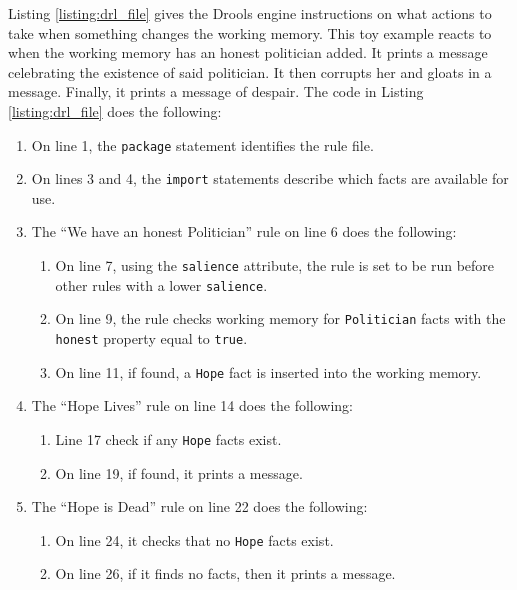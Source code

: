 Listing \ref{listing:drl_file} gives the Drools engine instructions on what actions to take when something changes the working memory.
This toy example reacts to when the working memory has an honest politician added. 
It prints a message celebrating the existence of said politician.
It then corrupts her and gloats in a message.
Finally, it prints a message of despair.
The code in Listing \ref{listing:drl_file} does the following: 
\begin{enumerate}[topsep=2pt,itemsep=2pt,partopsep=2pt, parsep=2pt]
    \setlength\itemsep{0em}
    \item On line 1, the \texttt{package} statement identifies the rule file.
    \item On lines 3 and 4, the \texttt{import} statements describe which facts are available for use.
    \item The ``We have an honest Politician'' rule on line 6 does the following:
    \begin{enumerate}[topsep=2pt,itemsep=2pt,partopsep=2pt, parsep=2pt]
        \setlength\itemsep{0em}
        \item On line 7, using the \texttt{salience} attribute, the rule is set to be run before other rules with a lower \texttt{salience}.
        \item On line 9, the rule checks working memory for \texttt{Politician} facts with the \texttt{honest} property equal to \texttt{true}.
        \item On line 11, if found, a \texttt{Hope} fact is inserted into the working memory.
    \end{enumerate}
    \item The ``Hope Lives'' rule on line 14 does the following:
    \begin{enumerate}[topsep=2pt,itemsep=2pt,partopsep=2pt, parsep=2pt]
        \setlength\itemsep{0em}
        \item Line 17 check if any \texttt{Hope} facts exist.
        \item On line 19, if found, it prints a message.
    \end{enumerate}
    \item The ``Hope is Dead'' rule on line 22 does the following:
    \begin{enumerate}[topsep=2pt,itemsep=2pt,partopsep=2pt, parsep=2pt]
        \setlength\itemsep{0em}
        \item On line 24, it checks that no \texttt{Hope} facts exist.
        \item On line 26, if it finds no facts, then it prints a message.  

\end{enumerate}
\end{enumerate}
